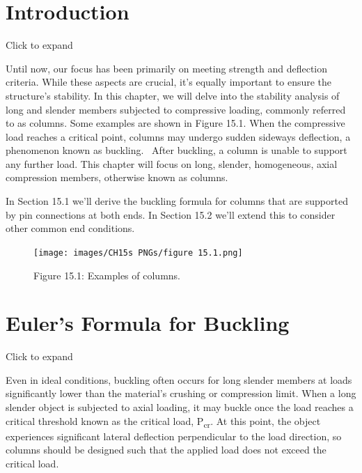 \documentclass[
  letterpaper,
  DIV=11,
  numbers=noendperiod]{scrreprt}
\theoremstyle{definition}
\theoremstyle{remark}
\begin{document}
\section*{Introduction}\label{introduction-14}


Click to expand

Until now, our focus has been primarily on meeting strength and
deflection criteria. While these aspects are crucial, it's equally
important to ensure the structure's stability. In this chapter, we will
delve into the stability analysis of long and slender members subjected
to compressive loading, commonly referred to as columns. Some examples
are shown in Figure 15.1. When the compressive load reaches a critical
point, columns may undergo sudden sideways deflection, a phenomenon
known as buckling.~ After buckling, a column is unable to support any
further load. This chapter will focus on long, slender, homogeneous,
axial compression members, otherwise known as columns.

In Section 15.1 we'll derive the buckling formula for columns that are
supported by pin connections at both ends. In Section 15.2 we'll extend
this to consider other common end conditions.

\begin{figure}[H]

{\centering \texttt{[image: images/CH15s PNGs/figure 15.1.png]}

}

\caption{Figure 15.1: Examples of columns.}

\end{figure}%

\section{Euler's Formula for Buckling}\label{sec-15.1}

Click to expand

Even in ideal conditions, buckling often occurs for long slender members
at loads significantly lower than the material's crushing or compression
limit. When a long slender object is subjected to axial loading, it may
buckle once the load reaches a critical threshold known as the critical
load, P\textsubscript{cr}. At this point, the object experiences
significant lateral deflection perpendicular to the load direction, so
columns should be designed such that the applied load does not exceed
the critical load.
\end{document}
